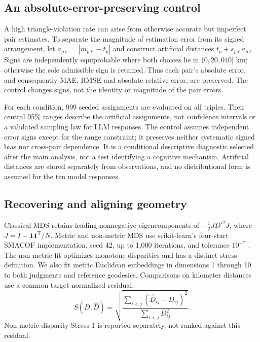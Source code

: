 \documentclass[12pt,a4paper]{article}
\begin{document}
\subsection{An absolute-error-preserving control}
A high triangle-violation rate can arise from otherwise accurate but imperfect pair estimates. To separate the magnitude of estimation error from its signed arrangement, let $a_{p\ell}=|m_{p\ell}-t_p|$ and construct artificial distances $t_p+s_{p\ell}a_{p\ell}$. Signs are independently equiprobable where both choices lie in $(0,20{,}040]$ km; otherwise the sole admissible sign is retained. Thus each pair's absolute error, and consequently MAE, RMSE and absolute relative error, are preserved. The control changes signs, not the identity or magnitude of the pair errors.

For each condition, 999 seeded assignments are evaluated on all triples. Their central 95\% ranges describe the artificial assignments, not confidence intervals or a validated sampling law for LLM responses. The control assumes independent error signs except for the range constraint; it preserves neither systematic signed bias nor cross-pair dependence. It is a conditional descriptive diagnostic selected after the main analysis, not a test identifying a cognitive mechanism. Artificial distances are stored separately from observations, and no distributional form is assumed for the ten model responses.

\subsection{Recovering and aligning geometry}
Classical MDS retains leading nonnegative eigencomponents of $-\tfrac12 JD^{\circ2}J$, where $J=I-\mathbf{1}\mathbf{1}^{\mathsf T}/N$. Metric and non-metric MDS use scikit-learn's four-start SMACOF implementation, seed 42, up to 1,000 iterations, and tolerance $10^{-7}$ \cite{kruskal,sklearn}. The non-metric fit optimizes monotone disparities and has a distinct stress definition. We also fit metric Euclidean embeddings in dimensions 1 through 10 to both judgments and reference geodesics. Comparisons on kilometer distances use a common target-normalized residual,
\begin{equation}\label{eq:stress}
 S(D,\widehat D)=\sqrt{\frac{\sum_{i<j}(\widehat D_{ij}-D_{ij})^2}{\sum_{i<j}D_{ij}^2}}.
\end{equation}
Non-metric disparity Stress-1 is reported separately, not ranked against this residual.
\end{document}
